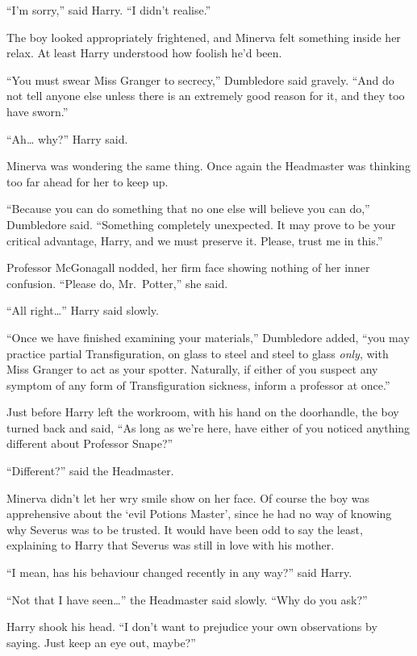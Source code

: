 ``I'm sorry,'' said Harry. ``I didn't realise.''

The boy looked appropriately frightened, and Minerva felt something
inside her relax. At least Harry understood how foolish he'd been.

``You must swear Miss Granger to secrecy,'' Dumbledore said gravely.
``And do not tell anyone else unless there is an extremely good reason
for it, and they too have sworn.''

``Ah\ldots{} why?'' Harry said.

Minerva was wondering the same thing. Once again the Headmaster was
thinking too far ahead for her to keep up.

``Because you can do something that no one else will believe you can
do,'' Dumbledore said. ``Something completely unexpected. It may prove
to be your critical advantage, Harry, and we must preserve it. Please,
trust me in this.''

Professor McGonagall nodded, her firm face showing nothing of her inner
confusion. ``Please do, Mr.~Potter,'' she said.

``All right\ldots{}'' Harry said slowly.

``Once we have finished examining your materials,'' Dumbledore added,
``you may practice partial Transfiguration, on glass to steel and steel
to glass \emph{only}, with Miss Granger to act as your spotter.
Naturally, if either of you suspect any symptom of any form of
Transfiguration sickness, inform a professor at once.''

Just before Harry left the workroom, with his hand on the doorhandle,
the boy turned back and said, ``As long as we're here, have either of
you noticed anything different about Professor Snape?''

``Different?'' said the Headmaster.

Minerva didn't let her wry smile show on her face. Of course the boy was
apprehensive about the `evil Potions Master', since he had no way of
knowing why Severus was to be trusted. It would have been odd to say the
least, explaining to Harry that Severus was still in love with his
mother.

``I mean, has his behaviour changed recently in any way?'' said Harry.

``Not that I have seen\ldots{}'' the Headmaster said slowly. ``Why do
you ask?''

Harry shook his head. ``I don't want to prejudice your own observations
by saying. Just keep an eye out, maybe?''

